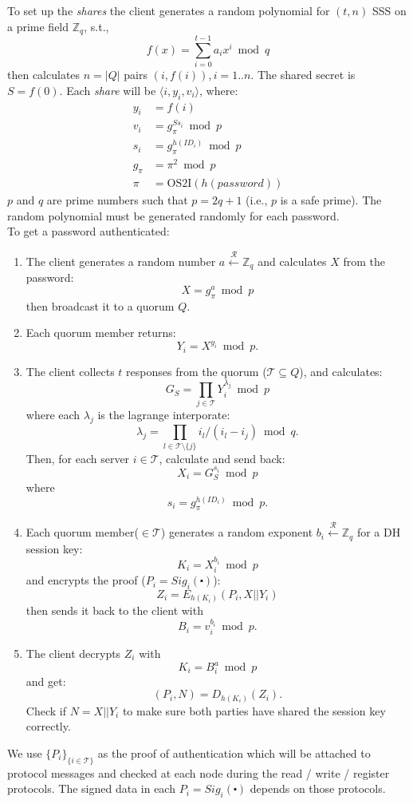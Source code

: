To set up the {\em shares} the client generates a random polynomial
for $(t, n)$ SSS on a prime field $\mathbb{Z}_q$, s.t.,
\[
  f(x) = \sum_{i=0}^{t-1}a_ix^i \bmod q
\]
then calculates $n=|Q|$ pairs $(i,f(i)), i = 1..n$. The shared secret
is $S = f(0)$. Each {\em share} will be $\langle i, y_i, v_i \rangle$,
where:
\begin{align*}
  y_i &= f(i) \\
  v_i &= g_{\pi}^{Ss_i} \bmod p \\
  s_i &= g_{\pi}^{h(ID_i)} \bmod p \\
  g_{\pi} &= \pi^2 \bmod p \\
  \pi &= \text{OS2I}(h(password))
\end{align*}
$p$ and $q$ are prime numbers such that $p = 2q + 1$ (i.e., $p$ is a
safe prime). The random polynomial must be generated randomly for each
password.\\

To get a password authenticated:
\begin{enumerate}
\item The client generates a random number
  $a \xleftarrow{\mathcal{R}} \mathbb{Z}_q$
  and calculates $X$ from the password:
  \[
    X = g_{\pi}^a \bmod p
  \]
  then broadcast it to a quorum $Q$.

\item Each quorum member returns:
  \[
    Y_i = X^{y_i} \bmod p.
  \]

\item The client collects $t$ responses from the quorum ($\mathcal{T}
  \subseteq Q$), and
  calculates:
  \[
    G_S = \prod_{j \in \mathcal{T}}Y_i^{\lambda_j} \bmod p
  \]
  where each $\lambda_j$ is the lagrange interporate:
  \[
    \lambda_j = \prod_{l \in \mathcal{T} \setminus \{j\}}
    i_l / (i_l - i_j) \bmod q.
  \]
  Then, for each server $i \in \mathcal{T}$, calculate and send back:
  \[
    X_i = G_S^{s_i} \bmod p
  \]
  where
  \[
    s_i = g_{\pi}^{h(ID_i)} \bmod p.
  \]

\item Each quorum member($\in \mathcal{T}$) generates a random exponent
  $b_i \xleftarrow{\mathcal{R}} \mathbb{Z}_q$
  for a DH session key:
  \[ K_i = X_i^{b_i} \bmod p \]
  and encrypts the proof ($P_i = Sig_i(\centerdot)$):
  \[
    Z_i = E_{h(K_i)}(P_i, X || Y_i)
  \]
  then sends it back to the client with
  \[
    B_i = v_i^{b_i} \bmod p.
  \]

\item The client decrypts $Z_i$ with
  \[
    K_i = B_i^{a} \bmod p
  \]
  and get:
  \[
    (P_i, N) = D_{h(K_i)}(Z_i).
  \]
  Check if $N = X||Y_i$ to make sure both parties have shared the
  session key correctly. 
\end{enumerate}
We use $\{P_i\}_{\{i \in \mathcal{T}\}}$ as the proof of
authentication which will be attached to protocol messages and checked
at each node during the {\sf read / write / register} protocols. The
signed data in each $P_i = Sig_i(\centerdot)$ depends on those
protocols.

